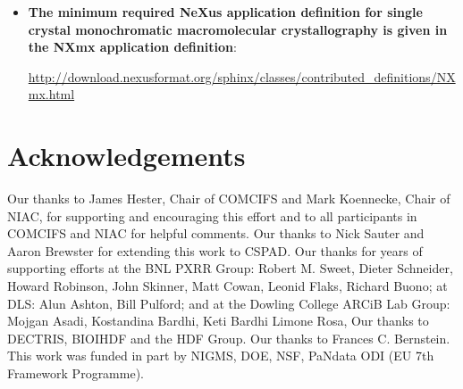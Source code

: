 \documentclass[11pt]{a0poster}
\begin{document}
\begin{minipage}[]{0.29\linewidth}
\begin{itemize}
\item{{\bf The minimum required NeXus application definition for single crystal 
monochromatic macromolecular crystallography is given in the NXmx application
definition}:

{\fontsize{18}{22}\selectfont \url{http://download.nexusformat.org/sphinx/classes/contributed_definitions/NXmx.html}}
}
\end{itemize}


 
\vspace{-12mm}
%
%



\vspace{-12mm}
\section*{Acknowledgements}

Our  thanks  to  James  Hester,  Chair  of  COMCIFS and  
Mark   Koennecke,   Chair   of   NIAC,   for   supporting  
and  encouraging  this  effort  and  to  all  participants  
in   COMCIFS   and  NIAC  for  helpful  comments.  Our thanks 
to   Nick   Sauter   and   Aaron Brewster  for  extending  
this  work  to  CSPAD.  Our  thanks  for  years  of  supporting  
efforts  at  the  BNL  PXRR  Group:  Robert  M.  Sweet,  Dieter  Schneider,  
Howard   Robinson,   John   Skinner,   Matt   Cowan,  
Leonid  Flaks,  Richard  Buono;  at DLS:  Alun  Ashton,  
Bill  Pulford;  and  at  the  Dowling  College  ARCiB  Lab  
Group: Mojgan   Asadi,   Kostandina   Bardhi, Keti Bardhi  
Limone  Rosa, Our   thanks   to  DECTRIS,   BIOIHDF and   the HDF  
Group.  Our  thanks  to  Frances  C.  Bernstein.
This   work  was  funded   in   part   by   NIGMS,   DOE,  
NSF,   PaNdata   ODI   (EU   7th   Framework  
Programme).
\end{minipage}\hfill

\vfill
\end{document}
